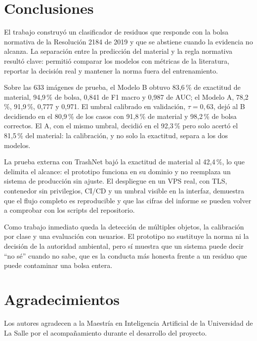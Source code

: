 \documentclass[10pt]{ieeeconf}
\renewenvironment{acknowledgments}{\section*{Agradecimientos}}{}
\begin{document}
\section{Conclusiones}
\label{sec:conclusiones}

El trabajo construy\'o un clasificador de residuos que responde con la bolsa
normativa de la Resoluci\'on 2184 de 2019 y que se abstiene cuando la evidencia no
alcanza. La separaci\'on entre la predicci\'on del material y la regla normativa
result\'o clave: permiti\'o comparar los modelos con m\'etricas de la literatura,
reportar la decisi\'on real y mantener la norma fuera del entrenamiento.

Sobre las 633 im\'agenes de prueba, el Modelo B obtuvo 83,6\,\% de exactitud de
material, 94,9\,\% de bolsa, 0,841 de F1 macro y 0,987 de AUC; el Modelo A,
78,2\,\%, 91,9\,\%, 0,777 y 0,971. El umbral calibrado en validaci\'on,
$\tau=0{,}63$, dej\'o al B decidiendo en el 80,9\,\% de los casos con 91,8\,\% de
material y 98,2\,\% de bolsa correctos. El A, con el mismo umbral, decidi\'o en
el 92,3\,\% pero solo acert\'o el 81,5\,\% del material: la calibraci\'on, y no
solo la exactitud, separa a los dos modelos.

La prueba externa con TrashNet baj\'o la exactitud de material al 42,4\,\%, lo
que delimita el alcance: el prototipo funciona en su dominio y no reemplaza un
sistema de producci\'on sin ajuste. El despliegue en un VPS real, con TLS,
contenedor sin privilegios, CI/CD y un umbral visible en la interfaz, demuestra
que el flujo completo es reproducible y que las cifras del informe se pueden
volver a comprobar con los scripts del repositorio.

Como trabajo inmediato queda la detecci\'on de m\'ultiples objetos, la
calibraci\'on por clase y una evaluaci\'on con usuarios. El prototipo no sustituye
la norma ni la decisi\'on de la autoridad ambiental, pero s\'i muestra que un
sistema puede decir ``no s\'e'' cuando no sabe, que es la conducta m\'as honesta
frente a un residuo que puede contaminar una bolsa entera.

\begin{acknowledgments}
Los autores agradecen a la Maestr\'ia en Inteligencia Artificial de la Universidad
de La Salle por el acompa\~namiento durante el desarrollo del proyecto.
\end{acknowledgments}

\clearpage


\end{document}
